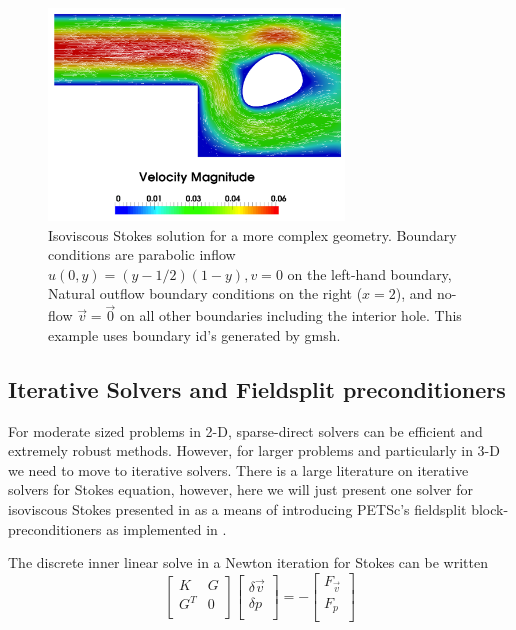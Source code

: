 \begin{figure}[htbp!]
  \centering
  \includegraphics[width=0.7\textwidth]{figures/stokes_gmsh.png}
  \caption{\small Isoviscous Stokes solution for a more complex geometry.
    Boundary conditions are parabolic inflow $u(0,y)=(y-1/2)(1-y),
    v=0$ on the left-hand boundary, Natural outflow boundary
    conditions on the right ($x=2$), and no-flow $\vec{v}=\vec{0}$ on
    all other boundaries including the interior hole.  This example
    uses boundary id's generated by gmsh.}
  \label{fig:stokes_gmsh}
\end{figure}

\subsection{Iterative Solvers and Fieldsplit preconditioners}
\label{sec:iterative-solvers-1}

For moderate sized problems in 2-D, sparse-direct solvers can be
efficient and extremely robust methods.  However, for larger problems
and particularly in 3-D we need to move to iterative solvers.  There
is a large literature on iterative solvers for Stokes equation, 
however, here we will just present one solver for isoviscous
Stokes presented in \cite{elman_finite_2005} as a means of introducing
PETSc's fieldsplit block-preconditioners as implemented in \TF{}.

The discrete inner linear solve in a Newton iteration for Stokes can
be written
\begin{equation}
  \label{eq:21}
     \left[
\begin{array}{cc}
  K & G  \\
  G^{T} & 0 \\
  \end{array}
  \right]
  \left[
    \begin{array}{c}
      \delta \vec{v} \\
      \delta p \\
    \end{array}
  \right] = -\left[
    \begin{array}{c}
      F_{\vec{v}} \\
      F_{p}\\
    \end{array}
  \right]
\end{equation}

